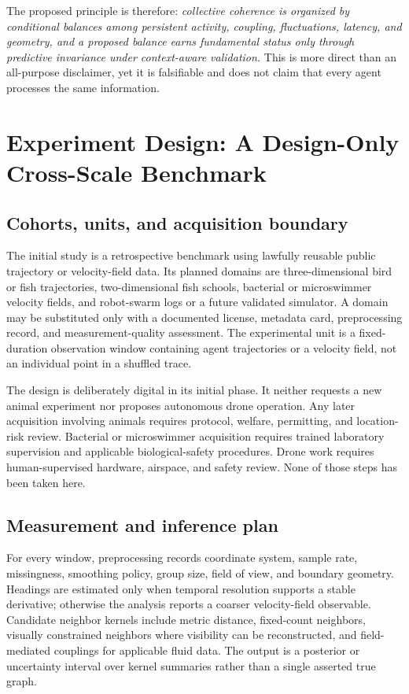 \documentclass[conference]{../../../../Conference-LaTeX-template_10-17-19/IEEEtran}
\begin{document}
The proposed principle is therefore: \emph{collective coherence is organized by conditional balances among persistent activity, coupling, fluctuations, latency, and geometry, and a proposed balance earns fundamental status only through predictive invariance under context-aware validation.} This is more direct than an all-purpose disclaimer, yet it is falsifiable and does not claim that every agent processes the same information.

\section{Experiment Design: A Design-Only Cross-Scale Benchmark}
\subsection{Cohorts, units, and acquisition boundary}
The initial study is a retrospective benchmark using lawfully reusable public trajectory or velocity-field data. Its planned domains are three-dimensional bird or fish trajectories, two-dimensional fish schools, bacterial or microswimmer velocity fields, and robot-swarm logs or a future validated simulator. A domain may be substituted only with a documented license, metadata card, preprocessing record, and measurement-quality assessment. The experimental unit is a fixed-duration observation window containing agent trajectories or a velocity field, not an individual point in a shuffled trace.

The design is deliberately digital in its initial phase. It neither requests a new animal experiment nor proposes autonomous drone operation. Any later acquisition involving animals requires protocol, welfare, permitting, and location-risk review. Bacterial or microswimmer acquisition requires trained laboratory supervision and applicable biological-safety procedures. Drone work requires human-supervised hardware, airspace, and safety review. None of those steps has been taken here.

\subsection{Measurement and inference plan}
For every window, preprocessing records coordinate system, sample rate, missingness, smoothing policy, group size, field of view, and boundary geometry. Headings are estimated only when temporal resolution supports a stable derivative; otherwise the analysis reports a coarser velocity-field observable. Candidate neighbor kernels include metric distance, fixed-count neighbors, visually constrained neighbors where visibility can be reconstructed, and field-mediated couplings for applicable fluid data. The output is a posterior or uncertainty interval over kernel summaries rather than a single asserted true graph.
\end{document}
